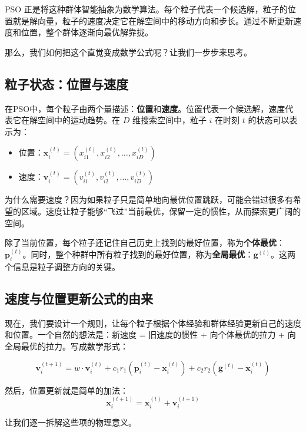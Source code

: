 \documentclass[lang=cn,zihao=-4,a4paper,fontset=windows]{beautybook}
\begin{document}
PSO 正是将这种群体智能抽象为数学算法。每个粒子代表一个候选解，粒子的位置就是解向量，粒子的速度决定它在解空间中的移动方向和步长。通过不断更新速度和位置，整个群体逐渐向最优解靠拢。

那么，我们如何把这个直觉变成数学公式呢？让我们一步步来思考。

\subsection{粒子状态：位置与速度}

在PSO中，每个粒子由两个量描述：\textbf{位置}和\textbf{速度}。位置代表一个候选解，速度代表它在解空间中的运动趋势。在 $D$ 维搜索空间中，粒子 $i$ 在时刻 $t$ 的状态可以表示为：

\begin{itemize}
    \item 位置：$\mathbf{x}_i^{(t)} = (x_{i1}^{(t)}, x_{i2}^{(t)}, \dots, x_{iD}^{(t)})$
    \item 速度：$\mathbf{v}_i^{(t)} = (v_{i1}^{(t)}, v_{i2}^{(t)}, \dots, v_{iD}^{(t)})$
\end{itemize}

为什么需要速度？因为如果粒子只是简单地向最优位置跳跃，可能会错过很多有希望的区域。速度让粒子能够“飞过”当前最优，保留一定的惯性，从而探索更广阔的空间。

除了当前位置，每个粒子还记住自己历史上找到的最好位置，称为\textbf{个体最优}：$\mathbf{p}_i^{(t)}$。同时，整个种群中所有粒子找到的最好位置，称为\textbf{全局最优}：$\mathbf{g}^{(t)}$。这两个信息是粒子调整方向的关键。

\subsection{速度与位置更新公式的由来}

现在，我们要设计一个规则，让每个粒子根据个体经验和群体经验更新自己的速度和位置。一个自然的想法是：新速度 = 旧速度的惯性 + 向个体最优的拉力 + 向全局最优的拉力。写成数学形式：

\[
\mathbf{v}_i^{(t+1)} = w \cdot \mathbf{v}_i^{(t)} + c_1 r_1 (\mathbf{p}_i^{(t)} - \mathbf{x}_i^{(t)}) + c_2 r_2 (\mathbf{g}^{(t)} - \mathbf{x}_i^{(t)})
\]

然后，位置更新就是简单的加法：
\[
\mathbf{x}_i^{(t+1)} = \mathbf{x}_i^{(t)} + \mathbf{v}_i^{(t+1)}
\]

让我们逐一拆解这些项的物理意义。
\end{document}
